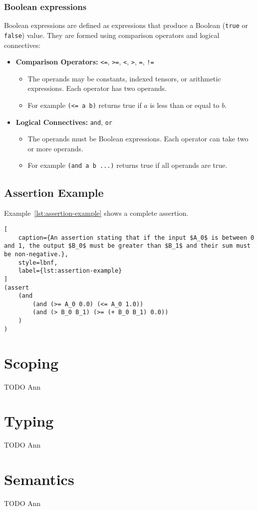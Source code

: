 \subsubsection*{Boolean expressions}
Boolean expressions are defined as expressions that produce a Boolean (\texttt{true} or \texttt{false}) value. They are formed using comparison operators and logical connectives:
\begin{itemize}
    \item \textbf{Comparison Operators:} \texttt{<=}, \texttt{>=}, \texttt{<}, \texttt{>}, \texttt{=}, \texttt{!=}
    \begin{itemize}
        \item The operands may be constants, indexed tensors, or arithmetic expressions. Each operator has two operands.
        \item For example \texttt{(<= a b)} returns true if $a$ is less than or equal to $b$.
    \end{itemize}
    \item \textbf{Logical Connectives:} \texttt{and}, \texttt{or}
    \begin{itemize}
        \item The operands must be Boolean expressions. Each operator can take two or more operands.
        \item For example \texttt{(and a b ...)} returns true if all operands are true.
    \end{itemize}
\end{itemize}

\subsection*{Assertion Example}
Example~\ref{lst:assertion-example} shows a complete assertion.

\begin{lstlisting}[
    caption={An assertion stating that if the input $A_0$ is between 0 and 1, the output $B_0$ must be greater than $B_1$ and their sum must be non-negative.},
    style=lbnf,
    label={lst:assertion-example}
]
(assert
    (and
        (and (>= A_0 0.0) (<= A_0 1.0))
        (and (> B_0 B_1) (>= (+ B_0 B_1) 0.0))
    )
)
\end{lstlisting}

\section{Scoping}
\label{sec:scoping}

TODO Ann

\section{Typing}
\label{sec:typing}

TODO Ann

\section{Semantics}
\label{sec:semantics}

TODO Ann

